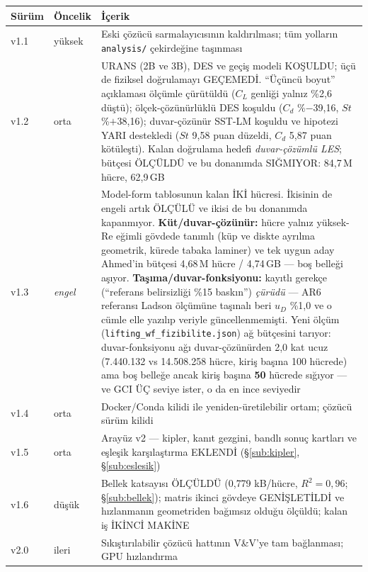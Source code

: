 \documentclass[11pt,a4paper]{article}
\begin{document}
\begin{center}\footnotesize
\begin{tabular}{@{}llp{86mm}@{}}
\toprule
\textbf{Sürüm} & \textbf{Öncelik} & \textbf{İçerik} \\
\midrule
v1.1 & yüksek & Eski çözücü sarmalayıcısının kaldırılması; tüm yolların
                \texttt{analysis/} çekirdeğine taşınması \\
v1.2 & orta   & URANS (2B ve 3B), DES ve geçiş modeli KOŞULDU; üçü de fiziksel
                doğrulamayı GEÇEMEDİ. ``Üçüncü boyut'' açıklaması ölçümle
                çürütüldü ($C_L$ genliği yalnız \%2{,}6 düştü); ölçek-çözünürlüklü
                DES koşuldu ($C_d$ \%$-$39{,}16, $St$ \%$+$38{,}16); duvar-çözünür
                SST-LM koşuldu ve hipotezi YARI destekledi ($St$ 9{,}58 puan
                düzeldi, $C_d$ 5{,}87 puan kötüleşti). Kalan doğrulama hedefi
                \emph{duvar-çözümlü LES}; bütçesi ÖLÇÜLDÜ ve bu donanımda
                SIĞMIYOR: 84{,}7\,M hücre, 62{,}9\,GB \\
v1.3 & \emph{engel} & Model-form tablosunun kalan İKİ hücresi. İkisinin de engeli
                artık ÖLÇÜLÜ ve ikisi de bu donanımda kapanmıyor.
                \textbf{Küt/duvar-çözünür:} hücre yalnız yüksek-Re eğimli gövdede
                tanımlı (küp ve diskte ayrılma geometrik, kürede tabaka laminer) ve
                tek uygun aday Ahmed'in bütçesi 4,68\,M hücre / 4,74\,GB --- boş
                belleği aşıyor. \textbf{Taşıma/duvar-fonksiyonu:} kayıtlı gerekçe
                (``referans belirsizliği \%15 baskın'') \emph{çürüdü} --- AR6
                referansı Ladson ölçümüne taşınalı beri $u_D$ \%1{,}0 ve o cümle
                elle yazılıp veriyle güncellenmemişti. Yeni ölçüm
                (\texttt{lifting\_wf\_fizibilite.json}) ağ bütçesini tarıyor:
                duvar-fonksiyonu ağı duvar-çözünürden 2{,}0 kat ucuz
                (7.440.132 vs 14.508.258 hücre, kiriş başına 100
                hücrede) ama boş belleğe ancak kiriş başına
                \textbf{50} hücrede sığıyor --- ve GCI ÜÇ seviye ister,
                o da en ince seviyedir \\
v1.4 & orta   & Docker/Conda kilidi ile yeniden-üretilebilir ortam; çözücü
                sürüm kilidi \\
v1.5 & orta   & Arayüz v2 --- kipler, kanıt gezgini, bandlı sonuç kartları ve
                eşleşik karşılaştırma EKLENDİ (\S\ref{sub:kipler},
                \S\ref{sub:eslesik}) \\
v1.6 & düşük  & Bellek katsayısı ÖLÇÜLDÜ (0{,}779 kB/hücre, $R^2{=}0{,}96$;
                \S\ref{sub:bellek}); matris ikinci gövdeye GENİŞLETİLDİ ve
                hızlanmanın geometriden bağımsız olduğu ölçüldü; kalan iş
                İKİNCİ MAKİNE \\
v2.0 & ileri  & Sıkıştırılabilir çözücü hattının V\&V'ye tam bağlanması;
                GPU hızlandırma \\
\bottomrule
\end{tabular}
\end{center}
\end{document}

